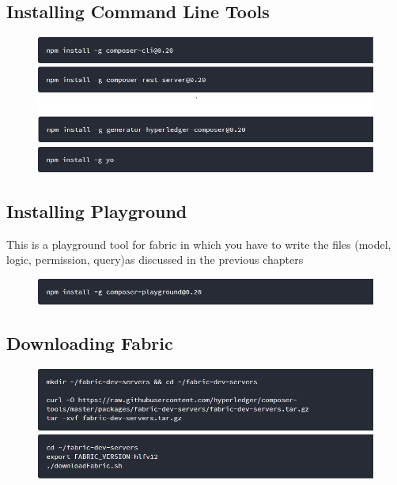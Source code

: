 \subsection{Installing Command Line Tools}
\begin{figure}[h]
	\centering
	\includegraphics[width=450px]{figures/installation/3.png}
	\includegraphics[width=450px]{figures/installation/4.png}
	\includegraphics[width=450px]{figures/installation/5.png}
	\includegraphics[width=450px]{figures/installation/6.png}
\end{figure}
\subsection{Installing Playground}
This is a playground tool for fabric in which you have to write the files (model, logic, permission, query)as discussed in the previous chapters 
\begin{figure}[h]
	\centering
	\includegraphics[width=450px]{figures/installation/7.png}
\end{figure}
\newpage
\subsection{Downloading Fabric}
\begin{figure}[h]
	\centering
	\includegraphics[width=450px]{figures/installation/8.png}
	\newline\newline
	\includegraphics[width=450px]{figures/installation/9.png}

\end{figure}

